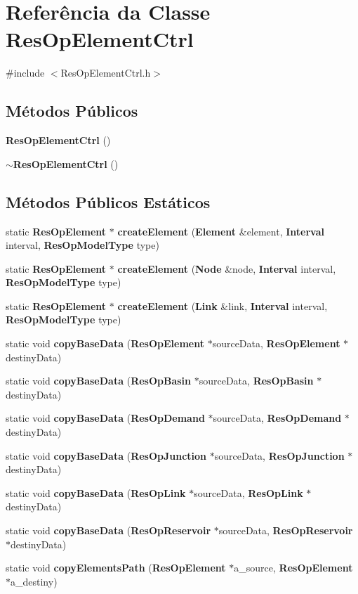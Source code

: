 \section{Referência da Classe Res\+Op\+Element\+Ctrl}
\label{class_res_op_element_ctrl}


{\ttfamily \#include $<$Res\+Op\+Element\+Ctrl.\+h$>$}

\subsection*{Métodos Públicos}
\begin{DoxyCompactItemize}
\item 
{\bf Res\+Op\+Element\+Ctrl} ()
\item 
{\bf $\sim$\+Res\+Op\+Element\+Ctrl} ()
\end{DoxyCompactItemize}
\subsection*{Métodos Públicos Estáticos}
\begin{DoxyCompactItemize}
\item 
static {\bf Res\+Op\+Element} $\ast$ {\bf create\+Element} ({\bf Element} \&element, {\bf Interval} interval, {\bf Res\+Op\+Model\+Type} type)
\item 
static {\bf Res\+Op\+Element} $\ast$ {\bf create\+Element} ({\bf Node} \&node, {\bf Interval} interval, {\bf Res\+Op\+Model\+Type} type)
\item 
static {\bf Res\+Op\+Element} $\ast$ {\bf create\+Element} ({\bf Link} \&link, {\bf Interval} interval, {\bf Res\+Op\+Model\+Type} type)
\item 
static void {\bf copy\+Base\+Data} ({\bf Res\+Op\+Element} $\ast$source\+Data, {\bf Res\+Op\+Element} $\ast$destiny\+Data)
\item 
static void {\bf copy\+Base\+Data} ({\bf Res\+Op\+Basin} $\ast$source\+Data, {\bf Res\+Op\+Basin} $\ast$destiny\+Data)
\item 
static void {\bf copy\+Base\+Data} ({\bf Res\+Op\+Demand} $\ast$source\+Data, {\bf Res\+Op\+Demand} $\ast$destiny\+Data)
\item 
static void {\bf copy\+Base\+Data} ({\bf Res\+Op\+Junction} $\ast$source\+Data, {\bf Res\+Op\+Junction} $\ast$destiny\+Data)
\item 
static void {\bf copy\+Base\+Data} ({\bf Res\+Op\+Link} $\ast$source\+Data, {\bf Res\+Op\+Link} $\ast$destiny\+Data)
\item 
static void {\bf copy\+Base\+Data} ({\bf Res\+Op\+Reservoir} $\ast$source\+Data, {\bf Res\+Op\+Reservoir} $\ast$destiny\+Data)
\item 
static void {\bf copy\+Elements\+Path} ({\bf Res\+Op\+Element} $\ast$a\+\_\+source, {\bf Res\+Op\+Element} $\ast$a\+\_\+destiny)
\end{DoxyCompactItemize}


